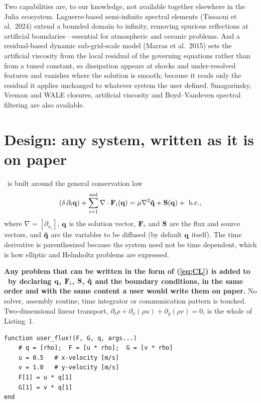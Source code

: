 \documentclass[10pt,onecolumn]{article}
\begin{document}
Two capabilities are, to our knowledge, not available together elsewhere in the
Julia ecosystem. Laguerre-based semi-infinite spectral elements (Tissaoui et
al.\ 2024) extend a bounded domain to infinity, removing spurious reflections at
artificial boundaries---essential for atmospheric and oceanic problems. And a
residual-based dynamic sub-grid-scale model (Marras et al.\ 2015) sets the
artificial viscosity from the local residual of the governing equations rather
than from a tuned constant, so dissipation appears at shocks and under-resolved
features and vanishes where the solution is smooth; because it reads only the
residual it applies unchanged to whatever system the user defined. Smagorinsky,
Vreman and WALE closures, artificial viscosity and Boyd--Vandeven spectral
filtering are also available.

\section{Design: any system, written as it is on paper}\label{design}

\je~is built around the general conservation law
\begin{equation}
\label{eq:CL}
\left(\delta\,\partial_t {\bf q}\right) + \sum_{i=1}^{\rm nsd}\nabla\cdot{{\bf F}_i({\bf q})} = \mu\nabla^2{\bf \hat{q}} + {\bf S}({\bf q}) + ~{\rm b.c.},
\end{equation}
where $\nabla = [\partial_{x_i}]$, $\bf q$ is the solution vector, ${\bf F}_i$
and $\bf S$ are the flux and source vectors, and $\bf\hat q$ are the variables to
be diffused (by default $\bf q$ itself). The time derivative is parenthesized
because the system need not be time dependent, which is how elliptic and
Helmholtz problems are expressed.

\textbf{Any problem that can be written in the form of (\ref{eq:CL}) is added to
\je~by declaring $\bf q$, ${\bf F}_i$, $\bf S$, $\bf\hat q$ and the boundary
conditions, in the same order and with the same content a user would write them
on paper.} No solver, assembly routine, time integrator or communication
pattern is touched. Two-dimensional linear transport,
$\partial_t\rho + \partial_x(\rho u) + \partial_y(\rho v) = 0$, is the whole of
Listing~1.

\begin{lstlisting}[caption={Flux function for 2D scalar advection.}]
function user_flux!(F, G, q, args...)
    # q = [rho];  F = [u * rho];  G = [v * rho]
    u = 0.5   # x-velocity [m/s]
    v = 1.0   # y-velocity [m/s]
    F[1] = u * q[1]
    G[1] = v * q[1]
end
\end{lstlisting}
\end{document}
